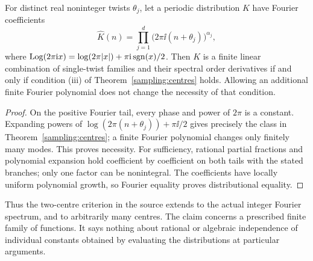 \begin{corollary}
\label{sampling:twisted}
For distinct real noninteger twists $\theta_j$, let a periodic
distribution $K$ have Fourier coefficients
\[
 \widehat K(n)=\prod_{j=1}^d\bigl(2\pi\ii(n+\theta_j)\bigr)^{\alpha_j},
\]
where $\operatorname{Log}(2\pi\mathrm i x)=\log(2\pi|x|)+\pi\mathrm i\operatorname{sgn}(x)/2$.
Then $K$ is a finite linear combination of single-twist families
and their spectral order derivatives if and only if condition (iii)
of Theorem~\ref{sampling:centres} holds. Allowing an additional finite
Fourier polynomial does not change the necessity of that condition.
\end{corollary}
\begin{proof}
On the positive Fourier tail, every phase and power of $2\pi$ is
a constant. Expanding powers of
$\log(2\pi(n+\theta_j))+\pi\ii/2$ gives precisely the class in
Theorem~\ref{sampling:centres}; a finite Fourier polynomial changes
only finitely many modes. This proves necessity. For sufficiency,
rational partial fractions and polynomial expansion hold coefficient
by coefficient on both tails with the stated branches; only one
factor can be nonintegral. The coefficients have locally uniform
polynomial growth, so Fourier equality proves distributional equality.
\end{proof}

Thus the two-centre criterion in the source extends to the actual
integer Fourier spectrum, and to arbitrarily many centres. The claim
concerns a prescribed finite family of functions. It says nothing
about rational or algebraic independence of individual constants
obtained by evaluating the distributions at particular arguments.
